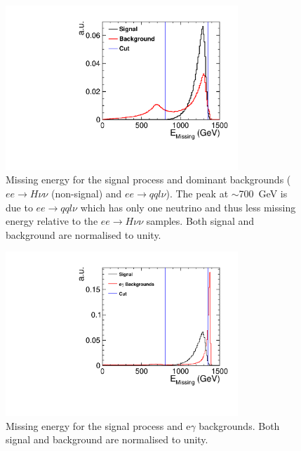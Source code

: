 \begin{figure}
  \centering
  \includegraphics[width=0.78\textwidth,keepaspectratio]{HiggsAnalysis/figures/EMissing_PreSelection}
  \caption[Missing energy of signal and background events]{Missing energy for the signal process and dominant backgrounds ($ee\rightarrow H\nu\nu$ (non-signal) and $ee\rightarrow qql\nu$). The peak at $\sim$700~GeV is due to $ee\rightarrow qql\nu$ which has only one neutrino and thus less missing energy relative to the $ee\rightarrow H\nu\nu$ samples. Both signal and background are normalised to unity.}
  \label{fig:EMissPreSel}
\end{figure}

\begin{figure}
  \centering
  \includegraphics[width=0.78\textwidth,keepaspectratio]{HiggsAnalysis/figures/EMissing_PreSelection_alt}
  \caption[Missing energy of signal and e$\gamma$ events]{Missing energy for the signal process and e$\gamma$ backgrounds. Both signal and background are normalised to unity.}
  \label{fig:EMissPreSelAlt}
\end{figure}

